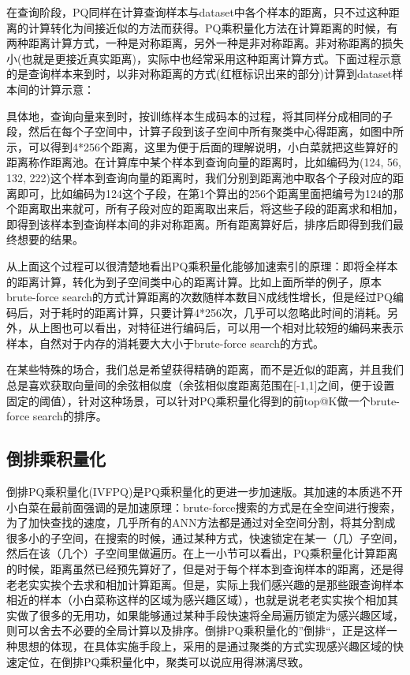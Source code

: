 \documentclass[color=cyan,mathpazo,titlestyle=hang]{elegantbook}
\begin{document}
在查询阶段，PQ同样在计算查询样本与dataset中各个样本的距离，只不过这种距离的计算转化为间接近似的方法而获得。PQ乘积量化方法在计算距离的时候，有两种距离计算方式，一种是对称距离，另外一种是非对称距离。非对称距离的损失小(也就是更接近真实距离)，实际中也经常采用这种距离计算方式。下面过程示意的是查询样本来到时，以非对称距离的方式(红框标识出来的部分)计算到dataset样本间的计算示意：


具体地，查询向量来到时，按训练样本生成码本的过程，将其同样分成相同的子段，然后在每个子空间中，计算子段到该子空间中所有聚类中心得距离，如图中所示，可以得到4*256个距离，这里为便于后面的理解说明，小白菜就把这些算好的距离称作距离池。在计算库中某个样本到查询向量的距离时，比如编码为(124, 56, 132, 222)这个样本到查询向量的距离时，我们分别到距离池中取各个子段对应的距离即可，比如编码为124这个子段，在第1个算出的256个距离里面把编号为124的那个距离取出来就可，所有子段对应的距离取出来后，将这些子段的距离求和相加，即得到该样本到查询样本间的非对称距离。所有距离算好后，排序后即得到我们最终想要的结果。

从上面这个过程可以很清楚地看出PQ乘积量化能够加速索引的原理：即将全样本的距离计算，转化为到子空间类中心的距离计算。比如上面所举的例子，原本brute-force search的方式计算距离的次数随样本数目N成线性增长，但是经过PQ编码后，对于耗时的距离计算，只要计算4*256次，几乎可以忽略此时间的消耗。另外，从上图也可以看出，对特征进行编码后，可以用一个相对比较短的编码来表示样本，自然对于内存的消耗要大大小于brute-force search的方式。

在某些特殊的场合，我们总是希望获得精确的距离，而不是近似的距离，并且我们总是喜欢获取向量间的余弦相似度（余弦相似度距离范围在[-1,1]之间，便于设置固定的阈值），针对这种场景，可以针对PQ乘积量化得到的前top@K做一个brute-force search的排序。

\subsection{倒排乘积量化}

倒排PQ乘积量化(IVFPQ)是PQ乘积量化的更进一步加速版。其加速的本质逃不开小白菜在最前面强调的是加速原理：brute-force搜索的方式是在全空间进行搜索，为了加快查找的速度，几乎所有的ANN方法都是通过对全空间分割，将其分割成很多小的子空间，在搜索的时候，通过某种方式，快速锁定在某一（几）子空间，然后在该（几个）子空间里做遍历。在上一小节可以看出，PQ乘积量化计算距离的时候，距离虽然已经预先算好了，但是对于每个样本到查询样本的距离，还是得老老实实挨个去求和相加计算距离。但是，实际上我们感兴趣的是那些跟查询样本相近的样本（小白菜称这样的区域为感兴趣区域），也就是说老老实实挨个相加其实做了很多的无用功，如果能够通过某种手段快速将全局遍历锁定为感兴趣区域，则可以舍去不必要的全局计算以及排序。倒排PQ乘积量化的”倒排“，正是这样一种思想的体现，在具体实施手段上，采用的是通过聚类的方式实现感兴趣区域的快速定位，在倒排PQ乘积量化中，聚类可以说应用得淋漓尽致。
\end{document}
